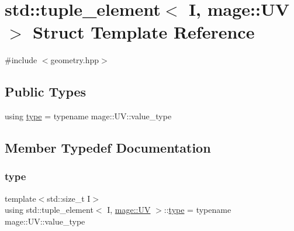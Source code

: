 \hypertarget{structstd_1_1tuple__element_3_01_i_00_01mage_1_1_u_v_01_4}{}\section{std\+:\+:tuple\+\_\+element$<$ I, mage\+:\+:UV $>$ Struct Template Reference}
\label{structstd_1_1tuple__element_3_01_i_00_01mage_1_1_u_v_01_4}


{\ttfamily \#include $<$geometry.\+hpp$>$}

\subsection*{Public Types}
\begin{DoxyCompactItemize}
\item 
using \mbox{\hyperlink{structstd_1_1tuple__element_3_01_i_00_01mage_1_1_u_v_01_4_a793980eda890cb8bc5540464e975fbe4}{type}} = typename mage\+::\+U\+V\+::value\+\_\+type
\end{DoxyCompactItemize}


\subsection{Member Typedef Documentation}
\mbox{\label{structstd_1_1tuple__element_3_01_i_00_01mage_1_1_u_v_01_4_a793980eda890cb8bc5540464e975fbe4}} 
\subsubsection{\texorpdfstring{type}{type}}
{\footnotesize\ttfamily template$<$std\+::size\+\_\+t I$>$ \\
using std\+::tuple\+\_\+element$<$ I, \mbox{\hyperlink{structmage_1_1_u_v}{mage\+::\+UV}} $>$\+::\mbox{\hyperlink{structstd_1_1tuple__element_3_01_i_00_01mage_1_1_u_v_01_4_a793980eda890cb8bc5540464e975fbe4}{type}} =  typename mage\+::\+U\+V\+::value\+\_\+type}

